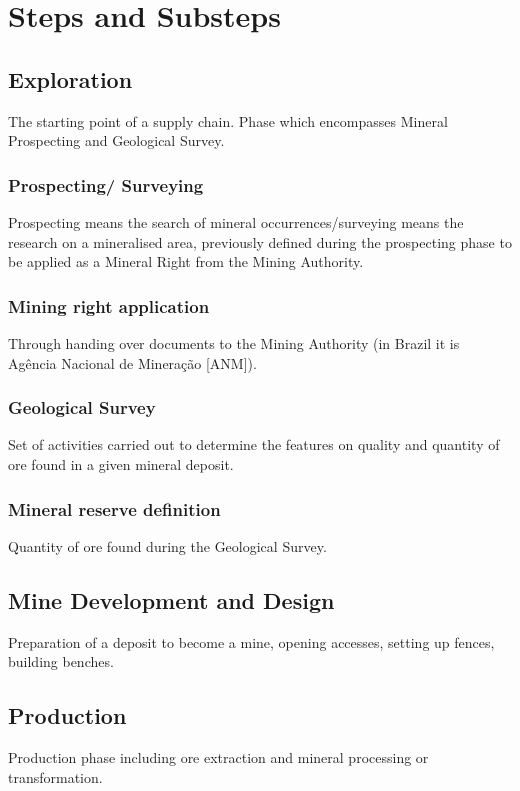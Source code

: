 \section{Steps and Substeps}\label{sec:stepsAndSubsteps}

\subsection{Exploration}\label{sec:Exploration}

The starting point of a supply chain. Phase which encompasses Mineral Prospecting and Geological Survey.

\subsubsection{Prospecting/ Surveying}\label{sec:Prospecting}
Prospecting means the search of mineral occurrences/surveying means the research on a mineralised area, previously defined during the prospecting phase to be applied as a Mineral Right from the Mining Authority.

\subsubsection{Mining right application}\label{sec:Mining}
Through handing over documents to the Mining Authority (in Brazil it is Agência Nacional de Mineração [ANM]).

\subsubsection{Geological Survey}\label{sec:GeologicalSurvey}
Set of activities carried out to determine the features on quality and quantity of ore found in a given mineral deposit.

\subsubsection{Mineral reserve definition}\label{sec:MineralReserve}
Quantity of ore found during the Geological Survey.

\subsection{Mine Development and Design}\label{sec:MineDevelopment}
Preparation of a deposit to become a mine, opening accesses, setting up fences, building benches.


\subsection{Production}\label{sec:Production}
Production phase including ore extraction and mineral processing or transformation.

